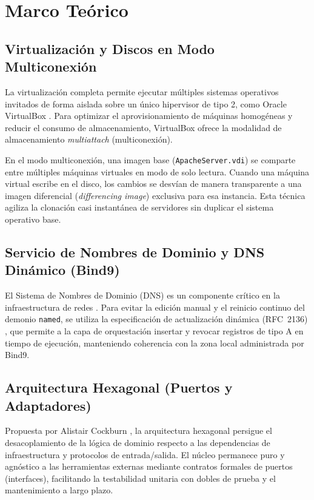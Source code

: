 \section{Marco Teórico}

\subsection{Virtualización y Discos en Modo Multiconexión}
La virtualización completa permite ejecutar múltiples sistemas operativos invitados de forma aislada sobre un único hipervisor de tipo 2, como Oracle VirtualBox \cite{virtualbox2024}. Para optimizar el aprovisionamiento de máquinas homogéneas y reducir el consumo de almacenamiento, VirtualBox ofrece la modalidad de almacenamiento \textit{multiattach} (multiconexión).

En el modo multiconexión, una imagen base (\texttt{ApacheServer.vdi}) se comparte entre múltiples máquinas virtuales en modo de solo lectura. Cuando una máquina virtual escribe en el disco, los cambios se desvían de manera transparente a una imagen diferencial (\textit{differencing image}) exclusiva para esa instancia. Esta técnica agiliza la clonación casi instantánea de servidores sin duplicar el sistema operativo base.

\subsection{Servicio de Nombres de Dominio y DNS Dinámico (Bind9)}
El Sistema de Nombres de Dominio (DNS) es un componente crítico en la infraestructura de redes \cite{albitz2001dns}. Para evitar la edición manual y el reinicio continuo del demonio \texttt{named}, se utiliza la especificación de actualización dinámica (RFC~2136) \cite{rfc2136}, que permite a la capa de orquestación insertar y revocar registros de tipo A en tiempo de ejecución, manteniendo coherencia con la zona local administrada por Bind9.

\subsection{Arquitectura Hexagonal (Puertos y Adaptadores)}
Propuesta por Alistair Cockburn \cite{cockburn2005hexagonal}, la arquitectura hexagonal persigue el desacoplamiento de la lógica de dominio respecto a las dependencias de infraestructura y protocolos de entrada/salida. El núcleo permanece puro y agnóstico a las herramientas externas mediante contratos formales de puertos (interfaces), facilitando la testabilidad unitaria con dobles de prueba y el mantenimiento a largo plazo.

